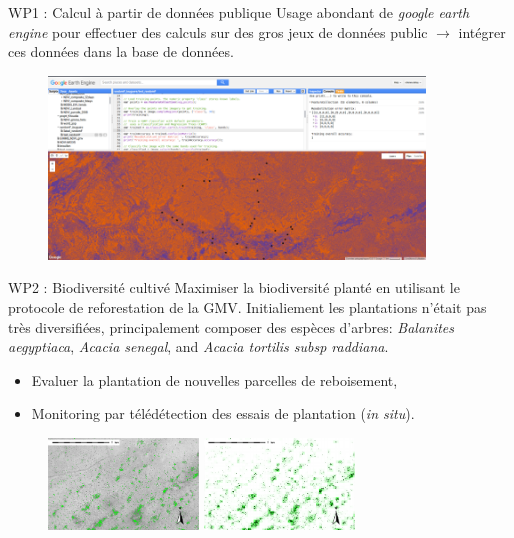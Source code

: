 \documentclass[newPxFont]{beamer}
\begin{document}
\begin{frame}[c]{WP1 : Calcul à partir de données publique}
\vspace{-2em}
Usage abondant de \textit{google earth engine} pour effectuer des calculs sur des gros jeux de données public $\rightarrow$ intégrer ces données dans la base de données.
\vspace{-1em}
\begin{figure}
	\centering
	\includegraphics[width = 10cm]{img/ggearthengine}
\end{figure}
\end{frame}

\begin{frame}[c]{WP2 : Biodiversité cultivé}
\vspace{-2em}
Maximiser la biodiversité planté en utilisant le protocole de reforestation de la GMV. Initialiement les plantations n'était pas très diversifiées, principalement composer des espèces d'arbres: \textit{Balanites aegyptiaca}, \textit{Acacia senegal}, and \textit{Acacia tortilis subsp raddiana}.
\begin{itemize}
  \item Evaluer la plantation de nouvelles parcelles de reboisement,
  \item Monitoring par télédétection des essais de plantation (\textit{in situ}).
\end{itemize}
\begin{figure}
	\centering
	\includegraphics[width = 4cm]{img/Trees_sup15m2}
  \includegraphics[width = 4cm]{img/GRID_Trees_sup15m2}
\end{figure}
\end{frame}
\end{document}
